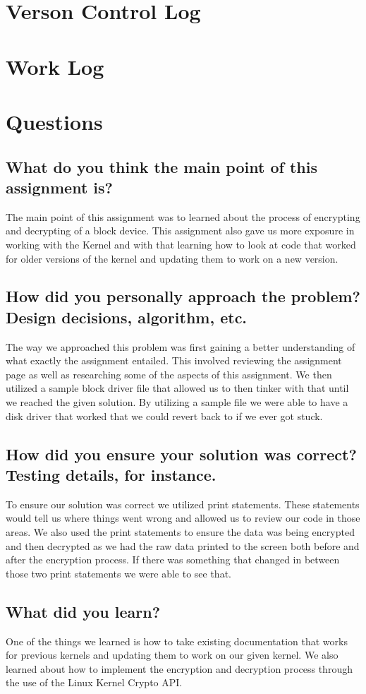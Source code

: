\documentclass[onecolumn, draftclsnofoot,10pt, compsoc]{IEEEtran}
\begin{document}
\section{Verson Control Log}

\section{Work Log}
\section{Questions}

\subsection{What do you think the main point of this assignment is?}
The main point of this assignment was to learned about the process of encrypting and decrypting of a block device. This assignment also gave us more exposure in working with the Kernel and with that learning how to look at code that worked for older versions of the kernel and updating them to work on a new version.


\subsection{How did you personally approach the problem? Design decisions, algorithm, etc.}
The way we approached this problem was first gaining a better understanding of what exactly the assignment entailed. This involved reviewing the assignment page as well as researching some of the aspects of this assignment. We then utilized a sample block driver file that allowed us to then tinker with that until we reached the given solution. By utilizing a sample file we were able to have a disk driver that worked that we could revert back to if we ever got stuck.


\subsection{How did you ensure your solution was correct? Testing details, for instance.}
To ensure our solution was correct we utilized print statements. These statements would tell us where things went wrong and allowed us to review our code in those areas. We also used the print statements to ensure the data was being encrypted and then decrypted as we had the raw data printed to the screen both before and after the encryption process. If there was something that changed in between those two print statements we were able to see that.


\subsection{What did you learn?}
One of the things we learned is how to take existing documentation that works for previous kernels and updating them to work on our given kernel. We also learned about how to implement the encryption and decryption process through the use of the Linux Kernel Crypto API.
\end{document}
